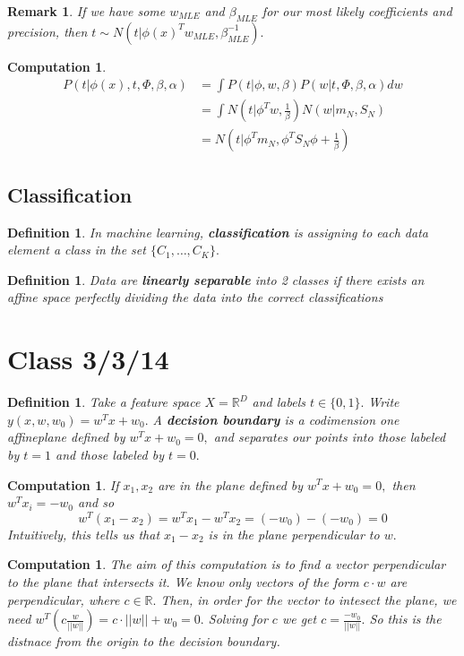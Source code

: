 \documentclass{amsart}
\newtheorem{comp}[subsubsection]{Computation}
\newtheorem{defn}[subsubsection]{Definition}
\newtheorem{rem}[subsubsection]{Remark}
\begin{document}
\begin{rem}
If we have some $w_{MLE}$ and $\beta_{MLE}$ for our most likely coefficients and precision, then $t \sim N(t|\phi(x)^T w_{MLE} , \beta_{MLE}^{-1}).$
\end{rem}

\begin{comp}
\begin{align*}
P(t|\phi(x),t,\Phi,\beta,\alpha) &= \int P(t|\phi,w,\beta)P(w|t,\Phi,\beta,\alpha)dw
\\
&= \int N(t|\phi^T w, \frac 1 \beta)N(w|m_N,S_N)
\\
&= N(t|\phi^Tm_N,\phi^TS_N\phi + \frac 1 \beta)
\end{align*}
\end{comp}

\subsection{Classification}
\begin{defn}
In machine learning, {\bf classification} is assigning to each data element a class in the set $\{C_1, \ldots, C_K\}.$
\end{defn}

\begin{defn}
Data are {\bf linearly separable} into 2 classes if there exists an affine space perfectly dividing the data into the correct classifications
\end{defn}

\section{Class 3/3/14}

\begin{defn}
Take a feature space $X = \mathbb R^D$ and labels $t \in \{0,1\}.$ Write $y(x,w,w_0) = w^Tx + w_0.$ A {\bf decision boundary } is a codimension one affineplane defined by $w^Tx + w_0 = 0,$ and separates our points into those labeled by $t=1$ and those labeled by $t=0.$
\end{defn}

\begin{comp}
If $x_1, x_2$ are in the plane defined by $w^Tx+w_0 = 0,$ then $w^Tx_i = -w_0$ and so 
$$w^T(x_1 - x_2) = w^Tx_1 - w^Tx_2 = (-w_0)-(-w_0) = 0$$
Intuitively, this tells us that $x_1 - x_2$ is in the plane perpendicular to $w.$
\end{comp}
\begin{comp}
The aim of this computation is to find a vector perpendicular to the plane that intersects it. We know only vectors of the form $c \cdot w$ are perpendicular, where $c \in \mathbb R.$ Then, in order for the vector to intesect the plane, we need 
$w^T \left(c \frac {w}{||w||} \right) = c \cdot ||w|| + w_0 = 0.$
Solving for $c$ we get
$c = \frac {-w_0}{||w||}.$ So this is the distnace from the origin to the decision boundary.
\end{comp}
\end{document}
